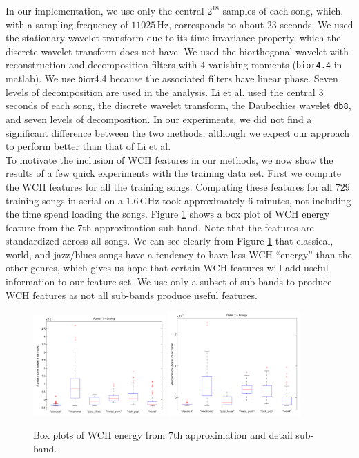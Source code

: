 \documentclass[12pt]{article}
\begin{document}
In our implementation, we use only the central $2^{18}$ samples of each song, which, with a sampling frequency of $11025\,\text{Hz}$, corresponds to about $23$ seconds.  We used the stationary wavelet transform due to its time-invariance property, which the discrete wavelet transform does not have.  We used the biorthogonal wavelet with reconstruction and decomposition filters with $4$ vanishing moments (\texttt{bior4.4} in {\sc matlab}).  We use {\texttt bior4.4} because the associated filters have linear phase.  Seven levels of decomposition are used in the analysis.  Li et al. used the central $3$ seconds of each song, the discrete wavelet transform, the Daubechies wavelet \texttt{db8}, and seven levels of decomposition.  In our experiments, we did not find a significant difference between the two methods, although we expect our approach to perform better than that of Li et al.\\

To motivate the inclusion of WCH features in our methods, we now show the results of a few quick experiments with the training data set.  First we compute the WCH features for all the training songs.  Computing these features for all $729$ training songs in serial on a $1.6\,\text{GHz}$ took approximately $6$ minutes, not including the time spend loading the songs.  Figure \ref{fig:wch_box} shows a box plot of WCH energy feature from the $7$th approximation sub-band.  Note that the features are standardized across all songs.  We can see clearly from Figure \ref{fig:wch_box} that classical, world, and jazz/blues songs have a tendency to have less WCH ``energy'' than the other genres, which gives us hope that certain WCH features will add useful information to our feature set.  We use only a subset of sub-bands to produce WCH features as not all sub-bands produce useful features.

\begin{figure}[h!]
   \centering
   \includegraphics[width=0.45\textwidth]{figures/wch_box_08.pdf}
   \includegraphics[width=0.45\textwidth]{figures/wch_box_16.pdf}
   \caption{Box plots of WCH energy from $7$th approximation and detail sub-band.}
   \label{fig:wch_box}
\end{figure}
\end{document}
